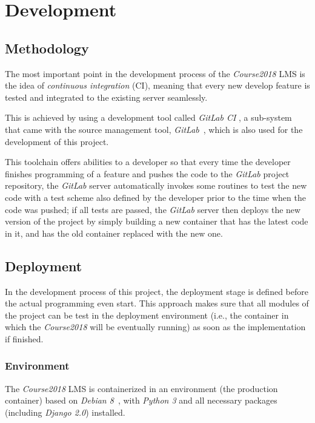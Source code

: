 

\chapter{Development}
\label{chap:DEV}

\section{Methodology}
The most important point in the development process of the \emph{Course2018}
LMS is the idea of \emph{continuous integration} (CI), meaning that every new
develop feature is tested and integrated to the existing server seamlessly.

\medskip
This is achieved by using a development tool called \emph{GitLab CI}
\cite{gitlabCI}, a sub-system that came with the source management tool,
\emph{GitLab}~\cite{gitlab}, which is also used for the development of this
project. 

\medskip

This toolchain offers abilities to a developer so that every time
the developer finishes programming of a feature and pushes the code to the
\emph{GitLab} project repository, the \emph{GitLab} server automatically
invokes some
routines to test the new code with a test scheme also defined by the developer
prior to the time when the code was pushed; if all tests are passed, 
the \emph{GitLab} server then deploys the new version of the project by simply
building a new container that has the latest code in it, and has the old
container replaced with the new one. 

\section{Deployment}
In the development process of this project, the deployment stage is defined
before the actual programming even start. This approach makes sure that all
modules of the project can be test in the
deployment environment (i.e., the container in which the \emph{Course2018}
will be eventually running) as soon as the implementation if finished.

\subsection{Environment}
The \emph{Course2018} LMS is containerized in an environment
(the production container) based on
\emph{Debian 8}~\cite{debian}, with \emph{Python 3} and all necessary packages
(including \emph{Django 2.0}) installed.

